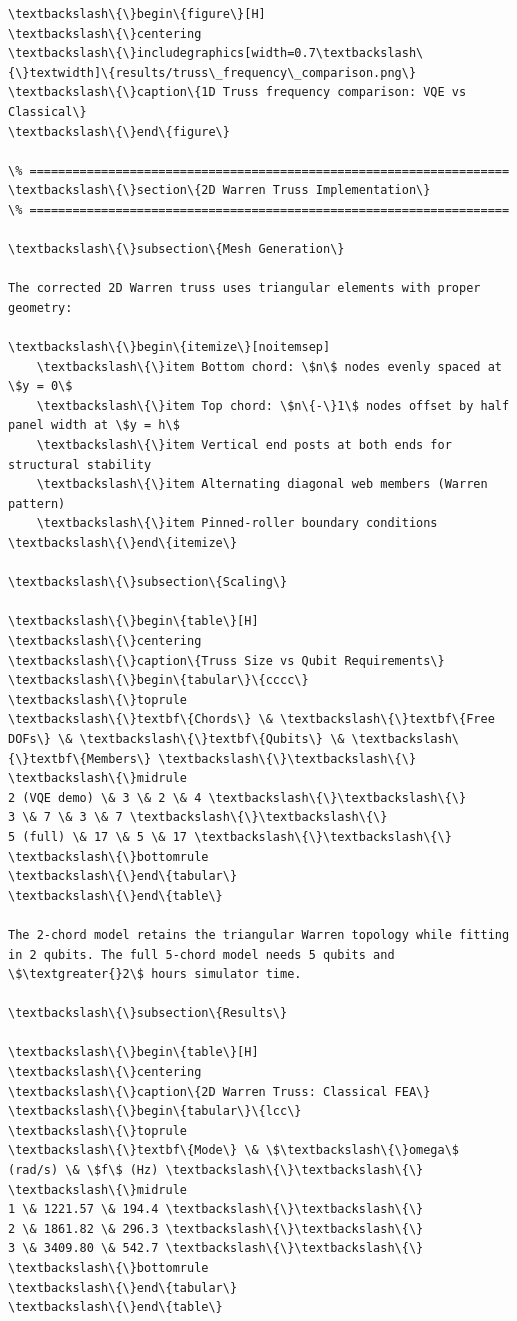 \documentclass[12pt, a4paper]{article}
\begin{document}
\begin{lstlisting}[style=codestyle, caption={VQA\_Modal\_Analysis\_Report.tex}]
\textbackslash\{\}begin\{figure\}[H]
\textbackslash\{\}centering
\textbackslash\{\}includegraphics[width=0.7\textbackslash\{\}textwidth]\{results/truss\_frequency\_comparison.png\}
\textbackslash\{\}caption\{1D Truss frequency comparison: VQE vs Classical\}
\textbackslash\{\}end\{figure\}

\% ===================================================================
\textbackslash\{\}section\{2D Warren Truss Implementation\}
\% ===================================================================

\textbackslash\{\}subsection\{Mesh Generation\}

The corrected 2D Warren truss uses triangular elements with proper geometry:

\textbackslash\{\}begin\{itemize\}[noitemsep]
    \textbackslash\{\}item Bottom chord: \$n\$ nodes evenly spaced at \$y = 0\$
    \textbackslash\{\}item Top chord: \$n\{-\}1\$ nodes offset by half panel width at \$y = h\$
    \textbackslash\{\}item Vertical end posts at both ends for structural stability
    \textbackslash\{\}item Alternating diagonal web members (Warren pattern)
    \textbackslash\{\}item Pinned-roller boundary conditions
\textbackslash\{\}end\{itemize\}

\textbackslash\{\}subsection\{Scaling\}

\textbackslash\{\}begin\{table\}[H]
\textbackslash\{\}centering
\textbackslash\{\}caption\{Truss Size vs Qubit Requirements\}
\textbackslash\{\}begin\{tabular\}\{cccc\}
\textbackslash\{\}toprule
\textbackslash\{\}textbf\{Chords\} \& \textbackslash\{\}textbf\{Free DOFs\} \& \textbackslash\{\}textbf\{Qubits\} \& \textbackslash\{\}textbf\{Members\} \textbackslash\{\}\textbackslash\{\}
\textbackslash\{\}midrule
2 (VQE demo) \& 3 \& 2 \& 4 \textbackslash\{\}\textbackslash\{\}
3 \& 7 \& 3 \& 7 \textbackslash\{\}\textbackslash\{\}
5 (full) \& 17 \& 5 \& 17 \textbackslash\{\}\textbackslash\{\}
\textbackslash\{\}bottomrule
\textbackslash\{\}end\{tabular\}
\textbackslash\{\}end\{table\}

The 2-chord model retains the triangular Warren topology while fitting in 2 qubits. The full 5-chord model needs 5 qubits and \$\textgreater{}2\$ hours simulator time.

\textbackslash\{\}subsection\{Results\}

\textbackslash\{\}begin\{table\}[H]
\textbackslash\{\}centering
\textbackslash\{\}caption\{2D Warren Truss: Classical FEA\}
\textbackslash\{\}begin\{tabular\}\{lcc\}
\textbackslash\{\}toprule
\textbackslash\{\}textbf\{Mode\} \& \$\textbackslash\{\}omega\$ (rad/s) \& \$f\$ (Hz) \textbackslash\{\}\textbackslash\{\}
\textbackslash\{\}midrule
1 \& 1221.57 \& 194.4 \textbackslash\{\}\textbackslash\{\}
2 \& 1861.82 \& 296.3 \textbackslash\{\}\textbackslash\{\}
3 \& 3409.80 \& 542.7 \textbackslash\{\}\textbackslash\{\}
\textbackslash\{\}bottomrule
\textbackslash\{\}end\{tabular\}
\textbackslash\{\}end\{table\}


\end{lstlisting}
\end{document}

